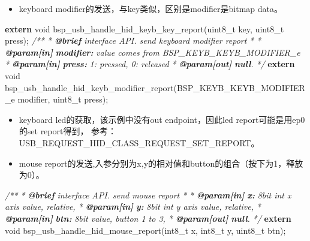 \documentclass[
  12pt,
]{book}
\newenvironment{Shaded}{\begin{snugshade}}{\end{snugshade}}
\newcommand{\AnnotationTok}[1]{\textcolor[rgb]{0.56,0.35,0.01}{\textbf{\textit{#1}}}}
\newcommand{\CommentTok}[1]{\textcolor[rgb]{0.56,0.35,0.01}{\textit{#1}}}
\newcommand{\CommentVarTok}[1]{\textcolor[rgb]{0.56,0.35,0.01}{\textbf{\textit{#1}}}}
\newcommand{\DataTypeTok}[1]{\textcolor[rgb]{0.13,0.29,0.53}{#1}}
\newcommand{\KeywordTok}[1]{\textcolor[rgb]{0.13,0.29,0.53}{\textbf{#1}}}
\newcommand{\NormalTok}[1]{#1}
\providecommand{\tightlist}{%
  \setlength{\itemsep}{0pt}\setlength{\parskip}{0pt}}
\begin{document}
\begin{itemize}
\tightlist
\item
  keyboard modifier的发送，与key类似，区别是modifier是bitmap data。
\end{itemize}

\begin{Shaded}
\begin{Highlighting}[]
\KeywordTok{extern} \DataTypeTok{void}\NormalTok{ bsp_usb_handle_hid_keyb_key_report(}\DataTypeTok{uint8_t}\NormalTok{ key, }\DataTypeTok{uint8_t}\NormalTok{ press);}
\CommentTok{/**}
\CommentTok{ * }\AnnotationTok{@brief}\CommentTok{ interface API. send keyboard modifier report}
\CommentTok{ *}
\CommentTok{ * }\AnnotationTok{@param[in]}\CommentTok{ }\CommentVarTok{modifier:}\CommentTok{ value comes from BSP_KEYB_KEYB_MODIFIER_e}
\CommentTok{ * }\AnnotationTok{@param[in]}\CommentTok{ }\CommentVarTok{press:}\CommentTok{ 1: pressed, 0: released}
\CommentTok{ * }\AnnotationTok{@param[out]}\CommentTok{ }\CommentVarTok{null}\CommentTok{. }
\CommentTok{ */}
\KeywordTok{extern} \DataTypeTok{void}\NormalTok{ bsp_usb_handle_hid_keyb_modifier_report(BSP_KEYB_KEYB_MODIFIER_e modifier, }\DataTypeTok{uint8_t}\NormalTok{ press);}
\end{Highlighting}
\end{Shaded}

\begin{itemize}
\item
  keyboard led的获取，该示例中没有out endpoint，因此led report可能是用ep0的set report得到， 参考：USB\_REQUEST\_HID\_CLASS\_REQUEST\_SET\_REPORT。
\item
  mouse report的发送,入参分别为x,y的相对值和button的组合（按下为1，释放为0）。
\end{itemize}

\begin{Shaded}
\begin{Highlighting}[]
\CommentTok{/**}
\CommentTok{ * }\AnnotationTok{@brief}\CommentTok{ interface API. send mouse report}
\CommentTok{ *}
\CommentTok{ * }\AnnotationTok{@param[in]}\CommentTok{ }\CommentVarTok{x:}\CommentTok{ 8bit int x axis value, relative,}
\CommentTok{ * }\AnnotationTok{@param[in]}\CommentTok{ }\CommentVarTok{y:}\CommentTok{ 8bit int y axis value, relative,}
\CommentTok{ * }\AnnotationTok{@param[in]}\CommentTok{ }\CommentVarTok{btn:}\CommentTok{ 8bit value, button 1 to 3,}
\CommentTok{ * }\AnnotationTok{@param[out]}\CommentTok{ }\CommentVarTok{null}\CommentTok{. }
\CommentTok{ */}
\KeywordTok{extern} \DataTypeTok{void}\NormalTok{ bsp_usb_handle_hid_mouse_report(}\DataTypeTok{int8_t}\NormalTok{ x, }\DataTypeTok{int8_t}\NormalTok{ y, }\DataTypeTok{uint8_t}\NormalTok{ btn);}
\end{Highlighting}
\end{Shaded}
\end{document}
